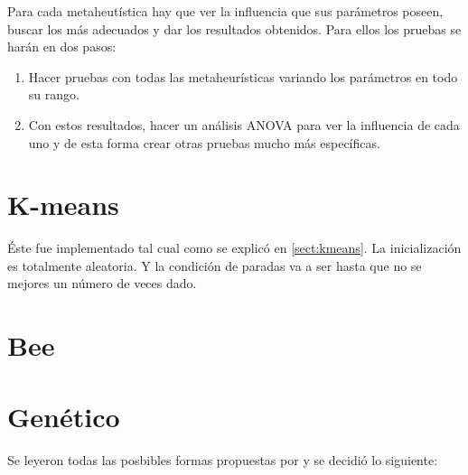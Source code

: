 Para cada metaheut\'istica hay que ver la influencia que sus par\'ametros 
poseen, buscar los m\'as adecuados y dar los resultados obtenidos.
Para ellos los pruebas se har\'an en dos pasos:

\begin{enumerate}

\item Hacer pruebas con todas las metaheur\'isticas variando los par\'ametros 
en todo su rango.

\item Con estos resultados, hacer un an\'alisis ANOVA para ver la influencia de cada
uno y de esta forma crear otras pruebas mucho m\'as espec\'ificas.

\end{enumerate}

\section{K-means}  \label{chap:ikmeans}

\'Este fue implementado tal cual como se explic\'o en \ref{sect:kmeans}. La
inicializaci\'on es totalmente aleatoria. Y la condici\'on de paradas
va a ser hasta que no se mejores un n\'umero de veces dado.

\section{Bee}  \label{chap:ibee}

\section{Gen\'etico}  \label{chap:igenetico}

Se leyeron todas las posbibles formas propuestas por \cite{HrCaFr2009} y se decidi\'o
lo siguiente:

